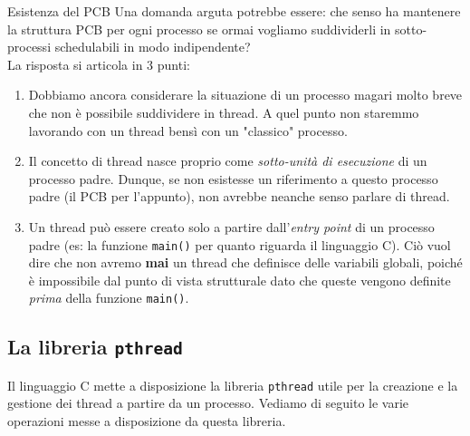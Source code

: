 \documentclass[12pt]{report}
\begin{document}
	\begin{osservazione}{Esistenza del PCB}{}
		Una domanda arguta potrebbe essere: che senso ha mantenere la struttura PCB per ogni processo se ormai vogliamo suddividerli in sotto-processi schedulabili in modo indipendente?\\
		La risposta si articola in 3 punti:
		\begin{enumerate}
			\item Dobbiamo ancora considerare la situazione di un processo magari molto breve che non è possibile suddividere in thread. A quel punto non staremmo lavorando con un thread bensì con un "classico" processo.
			
			\item Il concetto di thread nasce proprio come \textit{sotto-unità di esecuzione} di un processo padre. Dunque, se non esistesse un riferimento a questo processo padre (il PCB per l'appunto), non avrebbe neanche senso parlare di thread.
			
			\item Un thread può essere creato solo a partire dall'\textit{entry point} di un processo padre (es: la funzione \texttt{main()} per quanto riguarda il linguaggio C). Ciò vuol dire che non avremo \textbf{mai} un thread che definisce delle variabili globali, poiché è impossibile dal punto di vista strutturale dato che queste vengono definite \textit{prima} della funzione \texttt{main()}.
		\end{enumerate}
	\end{osservazione}
	
	\subsection{La libreria \texttt{pthread}}
	Il linguaggio C mette a disposizione la libreria \texttt{pthread} utile per la creazione e la gestione dei thread a partire da un processo. Vediamo di seguito le varie operazioni messe a disposizione da questa libreria.
	
\end{document}
